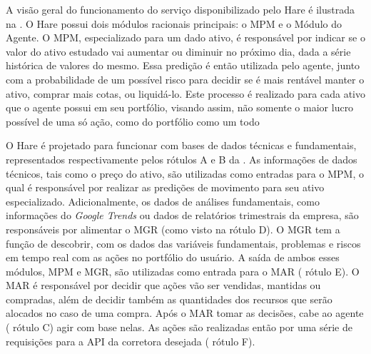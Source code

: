 A visão geral do funcionamento do serviço disponibilizado pelo Hare é ilustrada na . O Hare possui dois módulos racionais principais: o \acrfull{MPM} e o Módulo do Agente. O \acrshort{MPM}, especializado para um dado ativo, é responsável por indicar se o valor do ativo estudado vai aumentar ou diminuir no próximo dia, dada a série histórica de valores do mesmo. Essa predição é então utilizada pelo agente, junto com a probabilidade de um possível risco para decidir se é mais rentável manter o ativo, comprar mais cotas, ou liquidá-lo. Este processo é realizado para cada ativo que o agente possui em seu portfólio, visando assim, não somente o maior lucro possível de uma só ação, como do portfólio como um todo

%

O Hare é projetado para funcionar com bases de dados técnicas e fundamentais, representados respectivamente pelos rótulos A e B da . As informações de dados técnicos, tais como o preço do ativo, são utilizadas como entradas para o \acrshort{MPM}, o qual é responsável por realizar as predições de movimento para seu ativo especializado. Adicionalmente, os dados de análises fundamentais, como informações do \emph{Google Trends} ou dados de relatórios trimestrais da empresa, são responsáveis por alimentar o \acrfull{MGR} (como visto na  rótulo D). O \acrshort{MGR} tem a função de descobrir, com os dados das variáveis fundamentais, problemas e riscos em tempo real com as ações no portfólio do usuário. A saída de ambos esses módulos, \acrshort{MPM} e \acrshort{MGR}, são utilizadas como entrada para o \acrfull{MAR} ( rótulo E). O \acrfull{MAR} é responsável por decidir que ações vão ser vendidas, mantidas ou compradas, além de decidir também as quantidades dos recursos que serão alocados no caso de uma compra. Após o \acrshort{MAR} tomar as decisões, cabe ao agente ( rótulo C) agir com base nelas. As ações são realizadas então por uma série de requisições para a API da corretora desejada ( rótulo F).

